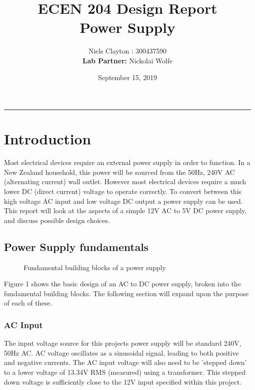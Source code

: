 \documentclass[a4paper,11pt]{article}
\begin{document}
\title{\LARGE{\textbf{ECEN 204 Design Report}\\Power Supply}}
\author{Niels Clayton : 300437590\\ \textbf{Lab Partner: }Nickolai Wolfe}
\date{September 15, 2019}
\maketitle
\hrule

\section{Introduction}
Most electrical devices require an external power supply in order to function.  In a New Zealand household, this power will be sourced from the 50Hz, 240V AC (alternating current) wall outlet. However most electrical devices require a much lower DC (direct current) voltage to operate correctly. To convert between this high voltage AC input and low voltage DC output a power supply can be used. This report will look at the aspects of a simple 12V AC to 5V DC power supply, and discuss possible design choices.

\subsection{Power Supply fundamentals}

\begin{figure}[h]
 \begin{center}
  \caption{Fundamental building blocks of a power supply}
 \end{center}
\end{figure}

Figure 1 shows the basic design of an AC to DC power supply, broken into the fundamental building blocks. The following section will expand upon the purpose of each of these. 

\subsubsection{AC Input}
The input voltage source for this projects power supply will be standard 240V, 50Hz AC. AC voltage oscillates as a sinusoidal signal, leading to both positive and negative currents. The AC input voltage will also need to be 'stepped down' to a lower voltage of 13.34V RMS (measured) using a transformer. This stepped down voltage is sufficiently close to the 12V input specified within this project.
\end{document}
